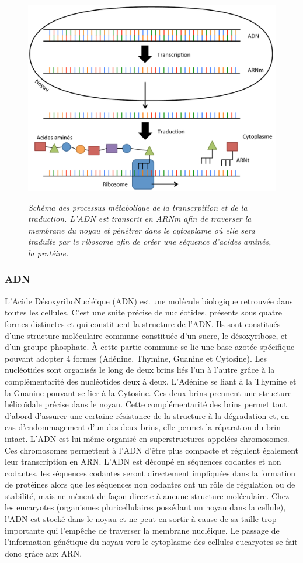 \begin{figure}
  \centering
  {\includegraphics[width=.75\linewidth]{./figures/ch1/transc_trad.pdf}}
    \caption{\it Schéma des processus métabolique de la transcrpition et de la traduction. L'ADN est transcrit en ARNm afin de traverser la membrane du noyau et pénétrer dans le cytosplame où elle sera traduite par le ribosome afin de créer une séquence d'acides aminés, la protéine.}
  \label{Fig:transc_trad}
  \hspace{0.3cm}
\end{figure}

\subsubsection{ADN}

L'Acide DésoxyriboNucléique (ADN) est une molécule biologique retrouvée dans toutes les cellules. C'est une suite précise de nucléotides, présents sous quatre formes distinctes et qui constituent la structure de l'ADN. Ils sont constitués d'une structure moléculaire commune constituée d'un sucre, le désoxyribose, et d'un groupe phosphate. À cette partie commune se lie une base azotée spécifique pouvant adopter 4 formes (Adénine, Thymine, Guanine et Cytosine). Les nucléotides sont organisés le long de deux brins liés l'un à l'autre grâce à la complémentarité des nucléotides deux à deux. L'Adénine se liant à la Thymine et la Guanine pouvant se lier à la Cytosine. Ces deux brins prennent une structure hélicoïdale précise dans le noyau. Cette complémentarité des brins permet tout d'abord d'assurer une certaine résistance de la structure à la dégradation et, en cas d'endommagement d'un des deux brins, elle permet la réparation du brin intact. L'ADN est lui-même organisé en superstructures appelées chromosomes. Ces chromosomes permettent à l'ADN d'être plus compacte et régulent également leur transcription en ARN.
L'ADN est découpé en séquences codantes et non codantes, les séquences codantes seront directement impliquées dans la formation de protéines alors que les séquences non codantes ont un rôle de régulation ou de stabilité, mais ne mènent de façon directe à aucune structure moléculaire.
Chez les eucaryotes (organismes pluricellulaires possédant un noyau dans la cellule), l'ADN est stocké dans le noyau et ne peut en sortir à cause de sa taille trop importante qui l'empêche de traverser la membrane nucléique. Le passage de l'information génétique du noyau vers le cytoplasme des cellules eucaryotes se fait donc grâce aux ARN.

